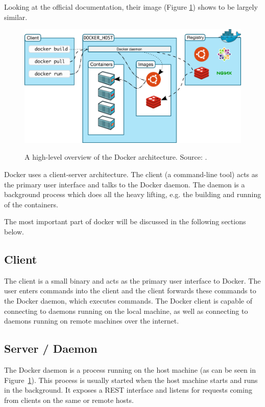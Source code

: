 Looking at the official documentation, their image (Figure \ref{fig:dockerarchipic}) shows to be largely similar.\\

\begin{figure}[H]
\caption{A high-level overview of the Docker architecture. Source: \cite{dockerarchi}.}
\centering
\includegraphics[scale=0.4]{4-softwarearch/images/architecture.png}
\label{fig:dockerarchipic}
\end{figure}
Docker uses a client-server architecture. The client (a command-line tool) acts as the primary user interface and talks to the Docker daemon. The daemon is a background process which does all the heavy lifting, e.g. the building and running of the containers.


The most important part of docker will be discussed in the following sections below.

\subsection{Client}
The client is a small binary and acts as the primary user interface to Docker. The user enters commands into the client and the client forwards these commands to the Docker daemon, which executes commands.
The Docker client is capable of connecting to daemons running on the local machine, as well as connecting to daemons running on remote machines over the internet.

\subsection{Server / Daemon}
The Docker daemon is a process running on the host machine (as can be seen in Figure~\ref{fig:dockerarchipic}). This process is usually started when the host machine starts and runs in the background. It exposes a REST interface and listens for requests coming from clients on the same or remote hosts.

